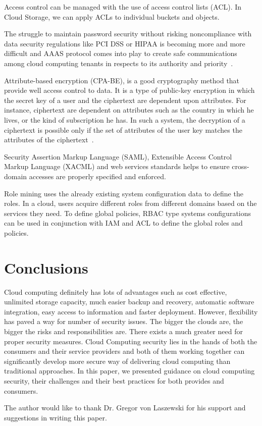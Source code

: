 Access control can be managed with the use of access control lists (ACL).
In Cloud Storage, we can apply ACLs to individual buckets and objects.

The struggle to maintain password security without risking noncompliance
with data security regulations like PCI DSS or HIPAA is becoming more and
more difficult and AAAS protocol comes into play to create safe 
communications among cloud computing tenants in respects to its authority
and priority~\cite{hid-sp18-513-poland}. 

Attribute-based encryption (CPA-BE), is a good cryptography 
method that provide well access control to data. It is a type of public-key 
encryption in which the secret key of a user and the ciphertext are 
dependent upon attributes. For instance, ciphertext are dependent on attributes 
such as the country in which he lives, or the kind of subscription he has.
In such a system, the decryption of a ciphertext is possible only if the set 
of attributes of the user key matches the attributes of the ciphertext~\cite{hid-sp18-513-poland}.

Security Assertion Markup Language (SAML), Extensible Access Control Markup Language
(XACML) and web services standards helps to ensure cross-domain accesses are
properly specified and enforced.

Role mining uses the already existing system configuration data to define the roles. 
In a cloud, users acquire different roles from different domains based on the 
services they need. To define global policies, RBAC type systems configurations 
can be used in conjunction with IAM and ACL to define the global roles and 
policies.

\section{Conclusions}
Cloud computing definitely has lots of advantages such as cost effective, 
unlimited storage capacity, much easier backup and recovery, automatic
software integration, easy access to information and faster deployment. 
However, flexibility has paved a way for number of security issues.
The bigger the clouds are, the bigger the risks and responsibilities are. 
There exists a much greater need for proper security measures.
Cloud Computing security lies in the hands of both the consumers and their
service providers and both of them working together can significantly 
develop more secure way of delivering cloud computing than traditional 
approaches. In this paper, we presented guidance on cloud computing security,
their challenges and their best practices for both provides and consumers.

\begin{acks}
The author would like to thank Dr. Gregor von Laszewski for his support and 
suggestions in writing this paper.
\end{acks}


 
